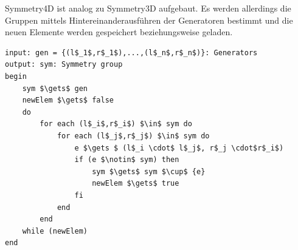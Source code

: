 Symmetry4D ist analog zu Symmetry3D aufgebaut. Es werden allerdings die Gruppen mittels Hintereinanderausführen der Generatoren bestimmt und die neuen Elemente werden gespeichert beziehungsweise geladen.
\begin{lstlisting}[mathescape, morekeywords={for, each, if, then, fi, do, begin,input, output, end, return}, caption={Peusdocode der Symmetriegruppenerzeugung}, label=alg:fromgen]
input: gen = {(l$_1$,r$_1$),...,(l$_n$,r$_n$)}: Generators
output: sym: Symmetry group
begin	
	sym $\gets$ gen
	newElem $\gets$ false
	do
		for each (l$_i$,r$_i$) $\in$ sym do
			for each (l$_j$,r$_j$) $\in$ sym do
				e $\gets $ (l$_i \cdot$ l$_j$, r$_j \cdot$r$_i$)
				if (e $\notin$ sym) then
					sym $\gets$ sym $\cup$ {e}
					newElem $\gets$ true
				fi
			end
		end
	while (newElem)
end 


\end{lstlisting}


